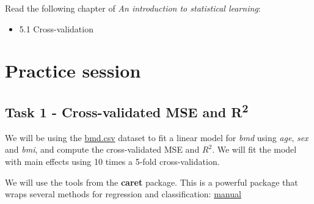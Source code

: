 \documentclass[
]{book}
\newenvironment{Shaded}{\begin{snugshade}}{\end{snugshade}}
\newcommand{\AttributeTok}[1]{\textcolor[rgb]{0.13,0.29,0.53}{#1}}
\newcommand{\CommentTok}[1]{\textcolor[rgb]{0.56,0.35,0.01}{\textit{#1}}}
\newcommand{\ConstantTok}[1]{\textcolor[rgb]{0.56,0.35,0.01}{#1}}
\newcommand{\DecValTok}[1]{\textcolor[rgb]{0.00,0.00,0.81}{#1}}
\newcommand{\FunctionTok}[1]{\textcolor[rgb]{0.13,0.29,0.53}{\textbf{#1}}}
\newcommand{\NormalTok}[1]{#1}
\newcommand{\OtherTok}[1]{\textcolor[rgb]{0.56,0.35,0.01}{#1}}
\newcommand{\SpecialCharTok}[1]{\textcolor[rgb]{0.81,0.36,0.00}{\textbf{#1}}}
\newcommand{\StringTok}[1]{\textcolor[rgb]{0.31,0.60,0.02}{#1}}
\providecommand{\tightlist}{%
  \setlength{\itemsep}{0pt}\setlength{\parskip}{0pt}}
\begin{document}
Read the following chapter of \emph{An introduction to statistical learning}:

\begin{itemize}
\tightlist
\item
  5.1 Cross-validation
\end{itemize}

\section{Practice session}\label{cv.prac}

\subsection*{\texorpdfstring{Task 1 - Cross-validated MSE and R\textsuperscript{2}}{Task 1 - Cross-validated MSE and R2}}\label{task-1---cross-validated-mse-and-r2}

We will be using the
\href{https://www.dropbox.com/s/7wjsfdaf0wt2kg2/bmd.csv?dl=1}{bmd.csv}
dataset to fit a linear model for \emph{bmd} using \emph{age}, \emph{sex} and \emph{bmi},
and compute the cross-validated MSE and \(R^2\).
We will fit the model with main effects using 10 times a 5-fold cross-validation.

We will use the tools from the \textbf{caret} package.
This is a powerful package that wraps several methods for regression and
classification: \href{http://topepo.github.io/caret/index.html}{manual}

\texttt{}

\begin{Shaded}
\end{Shaded}
\end{document}
